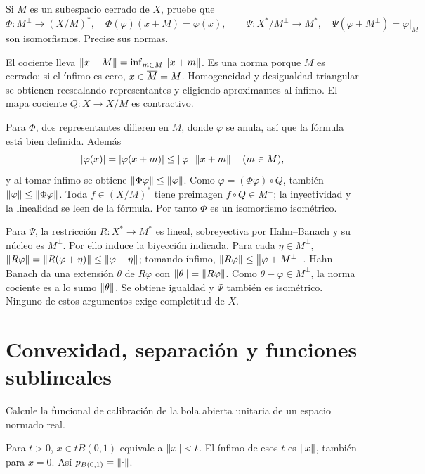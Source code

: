 \begin{ejercicio}\label{ej:v3-l02-5}
Si $M$ es un subespacio cerrado de $X$, pruebe que
\[
 \Phi:M^\perp\to(X/M)^*,\quad\Phi(\varphi)(x+M)=\varphi(x),\qquad
 \Psi:X^*/M^\perp\to M^*,\quad\Psi(\varphi+M^\perp)=\varphi|_M
\]
son isomorfismos. Precise sus normas.
\end{ejercicio}
\begin{solucion}
El cociente lleva $\left\lVert x+M\right\rVert=\inf_{m\in M}\left\lVert x+m\right\rVert$. Es una norma porque $M$ es cerrado: si el ínfimo es cero, $x\in\overline{M}=M$. Homogeneidad y desigualdad triangular se obtienen reescalando representantes y eligiendo aproximantes al ínfimo. El mapa cociente $Q:X\to X/M$ es contractivo.

Para $\Phi$, dos representantes difieren en $M$, donde $\varphi$ se anula, así que la fórmula está bien definida. Además
\[
 |\varphi(x)|=|\varphi(x+m)|\leq\left\lVert\varphi\right\rVert\left\lVert x+m\right\rVert\quad(m\in M),
\]
y al tomar ínfimo se obtiene $\left\lVert\Phi\varphi\right\rVert\leq\left\lVert\varphi\right\rVert$. Como $\varphi=(\Phi\varphi)\circ Q$, también $\left\lVert\varphi\right\rVert\leq\left\lVert\Phi\varphi\right\rVert$. Toda $f\in(X/M)^*$ tiene preimagen $f\circ Q\in M^\perp$; la inyectividad y la linealidad se leen de la fórmula. Por tanto $\Phi$ es un isomorfismo isométrico.

Para $\Psi$, la restricción $R:X^*\to M^*$ es lineal, sobreyectiva por Hahn--Banach y su núcleo es $M^\perp$. Por ello induce la biyección indicada. Para cada $\eta\in M^\perp$, $\left\lVert R\varphi\right\rVert=\left\lVert R(\varphi+\eta)\right\rVert\leq\left\lVert\varphi+\eta\right\rVert$; tomando ínfimo, $\left\lVert R\varphi\right\rVert\leq\left\lVert\varphi+M^\perp\right\rVert$. Hahn--Banach da una extensión $\theta$ de $R\varphi$ con $\left\lVert\theta\right\rVert=\left\lVert R\varphi\right\rVert$. Como $\theta-\varphi\in M^\perp$, la norma cociente es a lo sumo $\left\lVert\theta\right\rVert$. Se obtiene igualdad y $\Psi$ también es isométrico. Ninguno de estos argumentos exige completitud de $X$.
\end{solucion}

\chapter{Convexidad, separación y funciones sublineales}

\begin{ejercicio}\label{ej:v3-l05-1}
Calcule la funcional de calibración de la bola abierta unitaria de un espacio normado real.
\end{ejercicio}
\begin{solucion}
Para $t>0$, $x\in tB(0,1)$ equivale a $\left\lVert x\right\rVert<t$. El ínfimo de esos $t$ es $\left\lVert x\right\rVert$, también para $x=0$. Así $p_{B(0,1)}=\left\lVert\cdot\right\rVert$.
\end{solucion}

